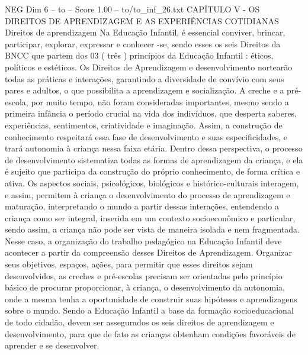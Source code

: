 \begin{textsample}{NEG Dim 6 – to – Score 1.00 – to/to\_inf\_26.txt}  \label{ex:f6_neg_119}
CAPÍTULO V - OS DIREITOS DE APRENDIZAGEM E AS EXPERIÊNCIAS COTIDIANAS Direitos de aprendizagem Na Educação Infantil, é essencial conviver, brincar, participar, explorar, expressar e conhecer -se, sendo esses os seis Direitos da BNCC que partem dos 03 ( três ) princípios da Educação Infantil : éticos, políticos e estéticos.
Os Direitos de Aprendizagem e desenvolvimento nortearão todas as práticas e interações, garantindo a diversidade de convívio com seus pares e adultos, o que possibilita a aprendizagem e socialização.
A creche e a pré-escola, por muito tempo, não foram consideradas importantes, mesmo sendo a primeira infância o período crucial na vida dos indivíduos, que desperta saberes, experiências, sentimentos, criatividade e imaginação.
Assim, a construção de conhecimento respeitará essa fase de desenvolvimento e suas especificidades, e trará autonomia à criança nessa faixa etária.
Dentro dessa perspectiva, o processo de desenvolvimento sistematiza todas as formas de aprendizagem da criança, e ela é sujeito que participa da construção do próprio conhecimento, de forma crítica e ativa.
Os aspectos sociais, psicológicos, biológicos e histórico-culturais interagem, e assim, permitem à criança o desenvolvimento do processo de aprendizagem e maturação, interpretando o mundo a partir dessas interações, entendendo a criança como ser integral, inserida em um contexto socioeconômico e particular, sendo assim, a criança não pode ser vista de maneira isolada e nem fragmentada.
Nesse caso, a organização do trabalho pedagógico na Educação Infantil deve acontecer a partir da compreensão desses Direitos de Aprendizagem.
Organizar seus objetivos, espaços, ações, para permitir que esses direitos sejam desenvolvidos, as creches e pré-escolas precisam ser orientadas pelo princípio básico de procurar proporcionar, à criança, o desenvolvimento da autonomia, onde a mesma tenha a oportunidade de construir suas hipóteses e aprendizagens sobre o mundo.
Sendo a Educação Infantil a base da formação socioeducacional de todo cidadão, devem ser assegurados os seis direitos de aprendizagem e desenvolvimento, para que de fato as crianças obtenham condições favoráveis de aprender e se desenvolver.

\end{textsample}

